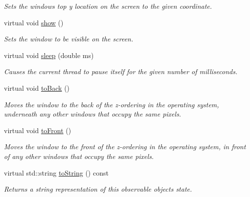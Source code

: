 \begin{DoxyCompactItemize}
\begin{DoxyCompactList}\small\item\em Sets the window\textquotesingle{}s top y location on the screen to the given coordinate. \end{DoxyCompactList}\item 
virtual void \mbox{\hyperlink{classGWindow_a4b148f40a95444d5669406b918ad2f52}{show}} ()
\begin{DoxyCompactList}\small\item\em Sets the window to be visible on the screen. \end{DoxyCompactList}\item 
virtual void \mbox{\hyperlink{classGWindow_aa3381590c1ef33c08000c2fbb2bf0dd0}{sleep}} (double ms)
\begin{DoxyCompactList}\small\item\em Causes the current thread to pause itself for the given number of milliseconds. \end{DoxyCompactList}\item 
virtual void \mbox{\hyperlink{classGWindow_a6053c984b166df7d3db5ee4c4ad65b99}{to\+Back}} ()
\begin{DoxyCompactList}\small\item\em Moves the window to the back of the z-\/ordering in the operating system, underneath any other windows that occupy the same pixels. \end{DoxyCompactList}\item 
virtual void \mbox{\hyperlink{classGWindow_a48a9c646659814220ac869bbcb60b52c}{to\+Front}} ()
\begin{DoxyCompactList}\small\item\em Moves the window to the front of the z-\/ordering in the operating system, in front of any other windows that occupy the same pixels. \end{DoxyCompactList}\item 
virtual std\+::string \mbox{\hyperlink{classGObservable_a1fe5121d6528fdea3f243321b3fa3a49}{to\+String}} () const
\begin{DoxyCompactList}\small\item\em Returns a string representation of this observable object\textquotesingle{}s state. \end{DoxyCompactList}\end{DoxyCompactItemize}
